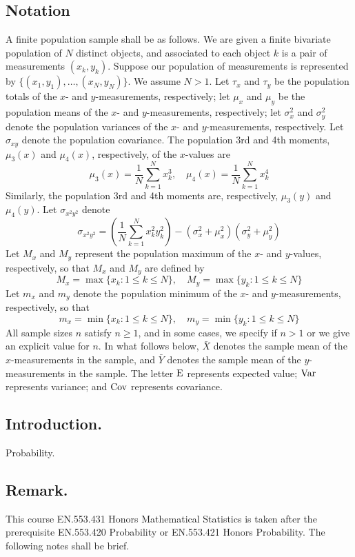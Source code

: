 \documentclass[titlepage]{article}
\begin{document}
\subsection{Notation} A finite population sample shall be as follows. We are given a finite bivariate population of $N$ distinct objects, and associated to each object $k$ is a pair of measurements $(x_k, y_k)$. Suppose our population of measurements is represented by $\{(x_1, y_1), \ldots, (x_N, y_N)\}$. We assume $N > 1$. Let $\tau_x$ and $\tau_y$ be the population totals of the $x$- and $y$-measurements, respectively; let $\mu_x$ and $\mu_y$ be the population means of the $x$- and $y$-measurements, respectively; let $\sigma_x^2$ and $\sigma_y^2$ denote the population variances of the $x$- and $y$-measurements, respectively. Let $\sigma_{xy}$ denote the population covariance.
The population 3rd and 4th moments, $\mu_3(x)$ and $\mu_4(x)$, respectively, of the $x$-values are
$$\mu_3(x) = \frac{1}{N} \sum_{k=1}^{N} x_k^3, \quad \mu_4(x) = \frac{1}{N} \sum_{k=1}^{N} x_k^4$$
Similarly, the population 3rd and 4th moments are, respectively, $\mu_3(y)$ and $\mu_4(y)$.
Let $\sigma_{x^2y^2}$ denote
$$\sigma_{x^2y^2} = \left( \frac{1}{N} \sum_{k=1}^{N} x_k^2 y_k^2 \right) - (\sigma_x^2 + \mu_x^2)(\sigma_y^2 + \mu_y^2)$$
Let $M_x$ and $M_y$ represent the population maximum of the $x$- and $y$-values, respectively, so that $M_x$ and $M_y$ are defined by
$$M_x = \max\{x_k : 1 \leq k \leq N\}, \quad M_y = \max\{y_k : 1 \leq k \leq N\}$$
Let $m_x$ and $m_y$ denote the population minimum of the $x$- and $y$-measurements, respectively, so that
$$m_x = \min\{x_k : 1 \leq k \leq N\}, \quad m_y = \min\{y_k : 1 \leq k \leq N\}$$
All sample sizes $n$ satisfy $n \geq 1$, and in some cases, we specify if $n > 1$ or we give an explicit value for $n$. In what follows below, $\bar{X}$ denotes the sample mean of the $x$-measurements in the sample, and $\bar{Y}$ denotes the sample mean of the $y$-measurements in the sample. The letter $\text{E}$ represents expected value; $\text{Var}$ represents variance; and $\text{Cov}$ represents covariance.

\newpage {}

\subsection{Introduction.} Probability.

\subsection{Remark.} This course EN.553.431 Honors Mathematical Statistics is taken after the prerequisite EN.553.420 Probability or EN.553.421 Honors Probability. The following notes shall be brief.
\end{document}
